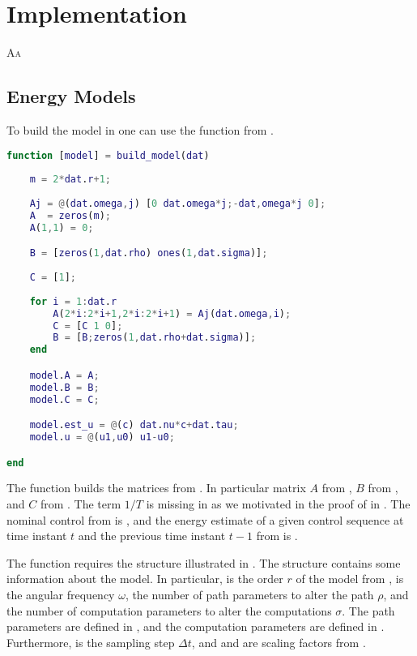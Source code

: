 
\chapter{\color{red}Implementation}
\label{app:imp}

\lettrine{A}{a}


\section{Energy Models}

To build the model in \matlab one can use the function  from .

\begin{lstlisting}[language=Matlab,caption={[Function to create the energy model]Function \stt{build\_model} that creates the energy model.},captionpos=b,label=lst:build_model]
function [model] = build_model(dat)
    
    m = 2*dat.r+1;
    
    Aj = @(dat.omega,j) [0 dat.omega*j;-dat,omega*j 0];
    A  = zeros(m);
    A(1,1) = 0;

    B = [zeros(1,dat.rho) ones(1,dat.sigma)];
        
    C = [1];
    
    for i = 1:dat.r
        A(2*i:2*i+1,2*i:2*i+1) = Aj(dat.omega,i); 
        C = [C 1 0];
        B = [B;zeros(1,dat.rho+dat.sigma)];
    end

    model.A = A;
    model.B = B;
    model.C = C;

    model.est_u = @(c) dat.nu*c+dat.tau;
    model.u = @(u1,u0) u1-u0;

end
\end{lstlisting}

The function builds the matrices from . In particular matrix $A$ from , $B$ from , and $C$ from . The term $1/T$ is missing in  as we motivated in the proof of  in . The nominal control from  is , and the energy estimate of a given control sequence at time instant $t$ and the previous time instant $t-1$ from  is . 

The function requires the structure  illustrated in . The structure contains some information about the model. In particular,  is the order $r$ of the model from ,  is the angular frequency $\omega$,  the number of path parameters to alter the path $\rho$, and  the number of computation parameters to alter the computations $\sigma$. The path parameters are defined in , and the computation parameters are defined in . Furthermore,  is the sampling step $\Delta t$, and  and  are scaling factors from .

